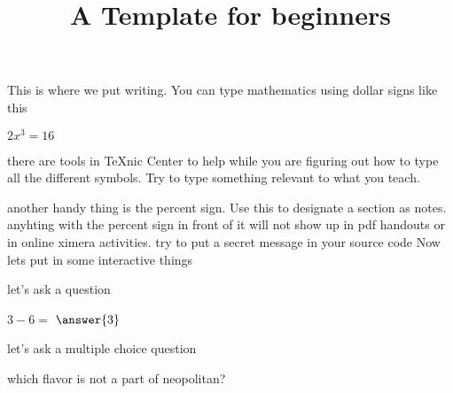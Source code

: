 \documentclass{ximera}
\title{A Template for beginners}
\begin{document}
\begin{abstract}
\end{abstract}
\maketitle
This is where we put writing. You can type mathematics using dollar signs like this
 
$2x^3=16$

there are tools in TeXnic Center to help while you are figuring out how to type all the different symbols. Try to type something relevant to what you teach.

another handy thing is the percent sign. Use this to designate a section as notes. anyhting with the percent sign in front of it will not show up in pdf handouts or in online ximera activities. try to put a secret message in your source code
Now lets put in some interactive things

let's ask a question
\begin{question} $3-6=$ $\answer{3}$
\end{question}

let's ask a multiple choice question
\begin{question} which flavor is not a part of neopolitan?
\begin{multipleChoice}
\end{multipleChoice}
\end{question}

\end{document}
